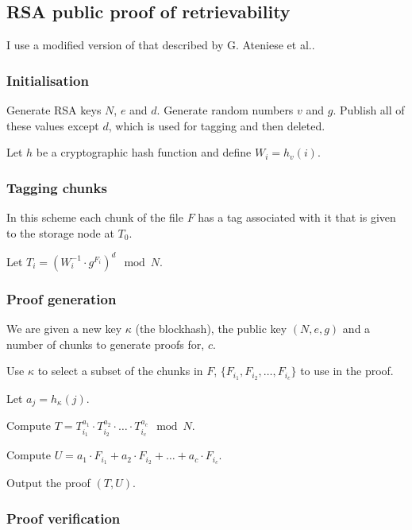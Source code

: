 \documentclass[12pt,a4paper,twoside,openright]{report}
\begin{document}
\subsection{RSA public proof of retrievability}

I use a modified version of that described by G. Ateniese et al.\cite{rsa-por}.


\subsubsection{Initialisation}

Generate RSA keys $N$, $e$ and $d$.
Generate random numbers $v$ and $g$.
Publish all of these values except $d$, which is used for tagging and then deleted.

Let $h$ be a cryptographic hash function and define
$W_i = h_v(i)$.

\subsubsection{Tagging chunks}

In this scheme each chunk of the file $F$ has a tag associated with it that is given to the storage node at $T_0$.

Let $T_i = \left(W_i^{-1} \cdot g^{F_i}\right)^d \mod N$.

\subsubsection{Proof generation}

We are given a new key $\kappa$ (the blockhash), the public key $(N, e, g)$ and a number of chunks to generate proofs for, $c$.

Use $\kappa$ to select a subset of the chunks in $F$, $\{F_{i_1}, F_{i_2}, \ldots, F_{i_c}\}$ to use in the proof.

Let $a_j = h_\kappa(j)$.

Compute $T = T^{a_1}_{i_1} \cdot T^{a_2}_{i_2} \cdot \ldots \cdot T^{a_c}_{i_c} \mod N$.

Compute $U = a_1 \cdot F_{i_1} + a_2 \cdot F_{i_2} + \ldots + a_c \cdot F_{i_c}$.

Output the proof $(T, U)$.

\subsubsection{Proof verification}
\end{document}
